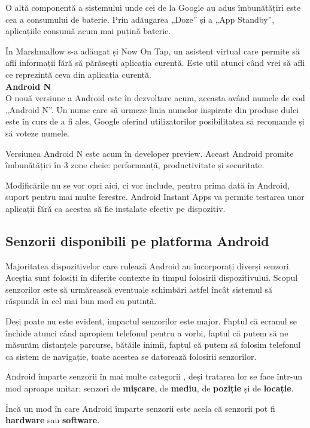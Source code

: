 \documentclass[12pt,a4paper]{article}
\begin{document}
	O altă componentă a sistemului unde cei de la Google au adus îmbunătățiri este cea a consumului de baterie. Prin adăugarea „Doze” și a „App Standby”, aplicațiile consumă acum mai puțină baterie.

	În Marshmallow s-a adăugat și Now On Tap, un asistent virtual care permite să afli informații fără să părăsești aplicația curentă. Este util atunci când vrei să afli ce reprezintă ceva din aplicația curentă.\\

\textbf{Android N}\\
O nouă versiune a Android este în dezvoltare acum, aceasta având numele de cod „Android N”. Un nume care să urmeze linia numelor inspirate din produse dulci este în curs de a fi ales, Google oferind utilizatorilor posibilitatea să recomande și să voteze numele.
	
	Versiunea Android N este acum în developer preview. Aceast Android promite îmbunătățiri în 3 zone cheie: performanță, productivitate și securitate.
	
	Modificările nu se vor opri aici, ci vor include, pentru prima dată în Android, suport pentru mai multe ferestre. Android Instant Apps va permite testarea unor aplicații fără ca acestea să fie instalate efectiv pe dispozitiv.\\
	

\newpage
\subsection{Senzorii disponibili pe platforma Android}
Majoritatea dispozitivelor care rulează Android au încorporați diverși senzori. Aceștia sunt folosiți în diferite contexte în timpul folosirii dispozitivului. Scopul senzorilor este să urmărească eventuale schimbări astfel încât sistemul să răspundă în cel mai bun mod cu putință.

	Deși poate nu este evident, impactul senzorilor este major. Faptul că ecranul se închide atunci când apropiem telefonul pentru a vorbi, faptul că putem să ne măsurăm distanțele parcurse, bătăile inimii, faptul că putem să folosim telefonul ca sistem de navigație, toate acestea se datorează folosirii senzorilor.
	
	Android împarte senzorii în mai multe categorii \cite{DeveloperAndroid}, deși tratarea lor se face într-un mod aproape unitar: senzori de \textbf{mișcare}, de \textbf{mediu}, de \textbf{poziție} și de \textbf{locație}.

	Încă un mod în care Android împarte senzorii este acela că senzorii pot fi \textbf{hardware} sau \textbf{software}.\\
	
\end{document}
